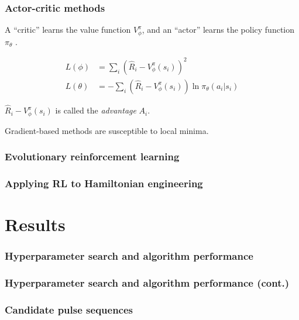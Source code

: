 \documentclass{beamer}
\begin{document}
\begin{frame}
\frametitle{Actor-critic methods}

A ``critic'' learns the value function $V^\pi_\phi$, and an ``actor'' learns the policy function $\pi_\theta$ \cite{sutton2018reinforcement}.

\begin{align}\label{eq:loss_fns}
    L(\phi) &= \sum_i (\hat{R}_i - V^\pi_\phi(s_i))^2 \\
    L(\theta) &= -\sum_i (\hat{R}_i - V^\pi_\phi(s_i))
        \ln \pi_\theta(a_i|s_i)
\end{align}

$\hat{R}_i - V^\pi_\phi(s_i)$ is called the \emph{advantage} $A_i$.

\pause

Gradient-based methods are susceptible to local minima.

\end{frame}

\begin{frame}
\frametitle{Evolutionary reinforcement learning}


\end{frame}

\begin{frame}
\frametitle{Applying RL to Hamiltonian engineering}


\end{frame}

\section{Results}

\begin{frame}
\frametitle{Hyperparameter search and algorithm performance}
\end{frame}

\begin{frame}
\frametitle{Hyperparameter search and algorithm performance (cont.)}
\end{frame}

\begin{frame}
\frametitle{Candidate pulse sequences}


\end{frame}
\end{document}
